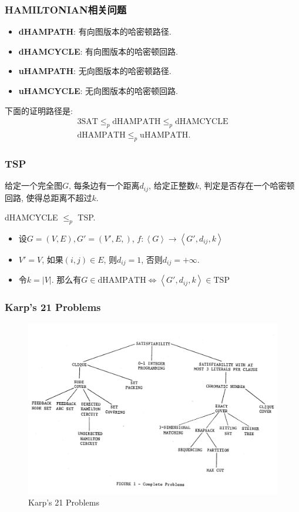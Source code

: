 \begin{frame}
    \frametitle{HAMILTONIAN相关问题}
    \begin{definition}
        \begin{itemize}
            \item \textbf{dHAMPATH}: 有向图版本的哈密顿路径.
            \item \textbf{dHAMCYCLE}: 有向图版本的哈密顿回路.
            \item \textbf{uHAMPATH}: 无向图版本的哈密顿路径.
            \item \textbf{uHAMCYCLE}: 无向图版本的哈密顿回路.
        \end{itemize}
    \end{definition}
    下面的证明路径是:
    \begin{align*}
        \text{3SAT} \le_p \text{dHAMPATH} \le_p \text{dHAMCYCLE} \\
        \text{dHAMPATH} \le_p \text{uHAMPATH}.
    \end{align*}
\end{frame}
\begin{frame}
    \frametitle{TSP}
    \begin{definition}[TSP]
        给定一个完全图$G$, 每条边有一个距离$d_{ij}$, 给定正整数$k$, 判定是否存在一个哈密顿回路, 使得总距离不超过$k$.
    \end{definition}
    dHAMCYCLE $\le_p$ TSP.
    \begin{itemize}
        \item 设$G = (V,E), G' = (V',E,)$, $f: \left\langle G\right\rangle \rightarrow \left\langle G', d_{ij}, k\right\rangle$
        \item $V' = V$, 如果$(i,j) \in E$, 则$d_{ij} = 1$, 否则$d_{ij} = +\infty$.
        \item 令$k = |V|$. 那么有$G \in \text{dHAMPATH} \iff \left\langle G', d_{ij}, k\right\rangle \in \text{TSP}$
    \end{itemize}
\end{frame}
\begin{frame}
    \frametitle{Karp's 21 Problems}
    \begin{figure}[H]
        \centering
        \includegraphics[width=1\textwidth]{images/Karp.png}
        \caption{Karp's 21 Problems}
    \end{figure}
\end{frame}
